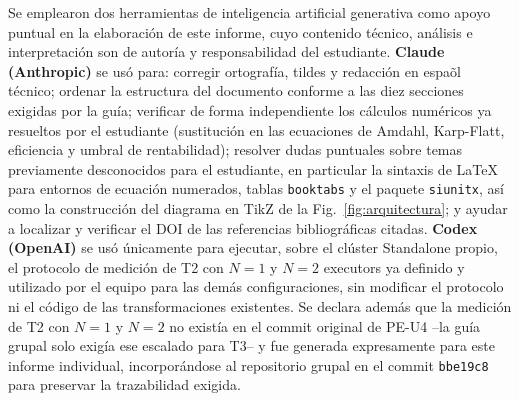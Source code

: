 \documentclass[10pt,journal]{IEEEtran}
\begin{document}
Se emplearon dos herramientas de inteligencia artificial generativa como
apoyo puntual en la elaboraci\'on de este informe, cuyo contenido t\'ecnico,
an\'alisis e interpretaci\'on son de autor\'ia y responsabilidad del
estudiante. \textbf{Claude (Anthropic)} se us\'o para: corregir ortograf\'ia,
tildes y redacci\'on en espa\~ol t\'ecnico; ordenar la estructura del
documento conforme a las diez secciones exigidas por la gu\'ia; verificar de
forma independiente los c\'alculos num\'ericos ya resueltos por el estudiante
(sustituci\'on en las ecuaciones de Amdahl, Karp-Flatt, eficiencia y umbral de
rentabilidad); resolver dudas puntuales sobre temas previamente
desconocidos para el estudiante, en particular la sintaxis de \LaTeX{} para
entornos de ecuaci\'on numerados, tablas \texttt{booktabs} y el paquete
\texttt{siunitx}, as\'i como la construcci\'on del diagrama en TikZ de la
Fig.~\ref{fig:arquitectura}; y ayudar a localizar y verificar el DOI de las
referencias bibliogr\'aficas citadas. \textbf{Codex (OpenAI)} se us\'o
\'unicamente para ejecutar, sobre el cl\'uster Standalone propio, el
protocolo de medici\'on de T2 con $N=1$ y $N=2$ executors ya definido y
utilizado por el equipo para las dem\'as configuraciones, sin modificar el
protocolo ni el c\'odigo de las transformaciones existentes. Se declara
adem\'as que la medici\'on de T2 con $N=1$ y $N=2$ no exist\'ia en el commit
original de PE-U4 --la gu\'ia grupal solo exig\'ia ese escalado para T3-- y
fue generada expresamente para este informe individual, incorpor\'andose al
repositorio grupal en el commit \texttt{bbe19c8} para preservar la
trazabilidad exigida.

\printbibliography
\end{document}

